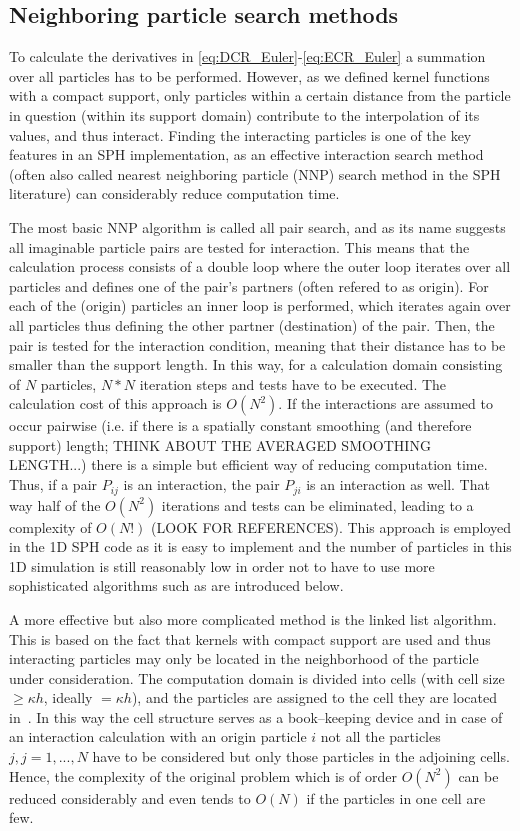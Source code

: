 \documentclass{report}
\begin{document}
\subsection{Neighboring particle search methods}
\label{sec:NNPS}
To calculate the derivatives in \ref{eq:DCR_Euler}-\ref{eq:ECR_Euler} a
summation over all particles has to be performed. However, as we defined kernel
functions with a compact support, only particles within a certain distance from
the particle in question (within its support domain) contribute to the
interpolation of its values, and thus interact. Finding the interacting
particles is one of the key features in an SPH implementation, as an effective
interaction search method (often also called nearest neighboring particle (NNP)
search method in the SPH literature) can considerably reduce
computation time. 

The most basic NNP algorithm is called all pair search, and as its name
suggests all imaginable particle pairs are tested for interaction. This means
that the calculation process consists of a double loop where the outer loop
iterates over all particles and defines one of the pair's partners (often
refered to as origin). For each of the (origin) particles an inner loop is
performed, which iterates again over all particles thus defining the other
partner (destination) of the pair. Then, the pair is tested for the
interaction condition, meaning that their distance has to be smaller than the
support length. In this way, for a calculation domain consisting of $N$
particles, $N*N$ iteration steps and tests have to be executed. The
calculation cost of this approach is $O(N^2)$. 
If the
interactions are assumed to occur pairwise (i.e. if there is a spatially constant
smoothing (and therefore support) length; THINK ABOUT THE AVERAGED SMOOTHING
LENGTH...) there is a simple but efficient way of reducing computation
time. Thus, if a pair $P_{ij}$ is an interaction, the pair
$P_{ji}$ is an interaction as well. That way half of the $O(N^2)$ iterations
and tests can be eliminated, leading to a complexity of $O(N!)$ (LOOK FOR
REFERENCES). This approach is employed in the 1D SPH code as it is easy to
implement\cite{Liu2003} and the number of particles in this 1D simulation is
still reasonably low in order not to have to use more sophisticated algorithms
such as are introduced below.

A more effective but also more complicated method is the linked list
algorithm. This is based on the fact that kernels with compact support are
used and thus interacting particles may only be located in the neighborhood of
the particle under consideration. The computation domain is divided into cells (with
cell size$\ge \kappa h$, ideally $=\kappa h$), and the
particles are assigned to the cell they are located in~\cite{Monaghan1983}. In this way the cell
structure serves as a book--keeping device and in case of an interaction
calculation with an origin particle $i$ not all the particles $j,j={1,...,N}$ have
to be considered but only those particles in the adjoining cells. Hence, the
complexity of the original problem which is of order $O(N^2)$ can be reduced
considerably and even tends to $O(N)$ if the particles in one cell are few. 
\end{document}
